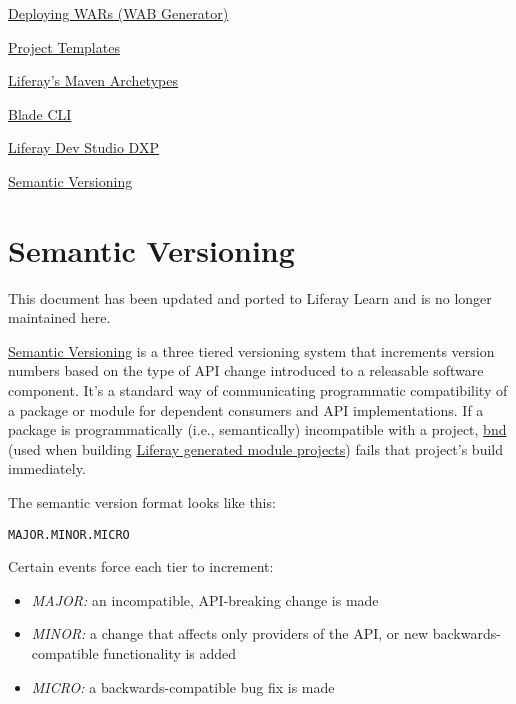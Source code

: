 \href{/docs/7-2/customization/-/knowledge_base/c/deploying-wars-wab-generator}{Deploying
WARs (WAB Generator)}

\href{/docs/7-2/reference/-/knowledge_base/r/project-templates}{Project
Templates}

\href{/docs/7-2/reference/-/knowledge_base/r/maven}{Liferay's Maven
Archetypes}

\href{/docs/7-2/reference/-/knowledge_base/r/blade-cli}{Blade CLI}

\href{/docs/7-2/reference/-/knowledge_base/r/liferay-dev-studio}{Liferay
Dev Studio DXP}

\href{/docs/7-2/customization/-/knowledge_base/c/semantic-versioning}{Semantic
Versioning}

\chapter{Semantic Versioning}\label{semantic-versioning}

{ This document has been updated and ported to Liferay Learn and is no
longer maintained here.}

\href{https://semver.org}{Semantic Versioning} is a three tiered
versioning system that increments version numbers based on the type of
API change introduced to a releasable software component. It's a
standard way of communicating programmatic compatibility of a package or
module for dependent consumers and API implementations. If a package is
programmatically (i.e., semantically) incompatible with a project,
\href{http://bnd.bndtools.org}{bnd} (used when building
\href{/docs/7-2/reference/-/knowledge_base/r/creating-a-project}{Liferay
generated module projects}) fails that project's build immediately.

The semantic version format looks like this:

\begin{verbatim}
MAJOR.MINOR.MICRO
\end{verbatim}

Certain events force each tier to increment:

\begin{itemize}
\tightlist
\item
  \emph{MAJOR:} an incompatible, API-breaking change is made
\item
  \emph{MINOR:} a change that affects only providers of the API, or new
  backwards- compatible functionality is added
\item
  \emph{MICRO:} a backwards-compatible bug fix is made
\end{itemize}

